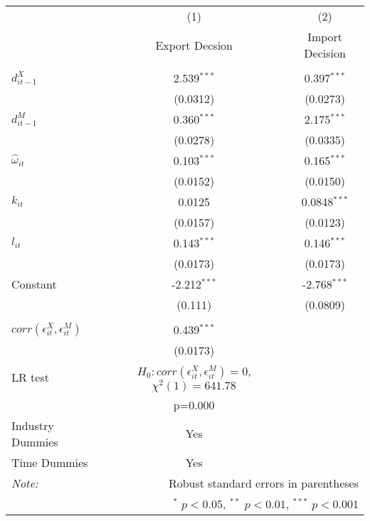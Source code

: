 \begin{center}
\begin{tabular}{l*{2}{c}}
\hline\hline
            &\multicolumn{1}{c}{(1)}&\multicolumn{1}{c}{(2)}\\
            &\multicolumn{1}{c}{Export
              Decsion}&\multicolumn{1}{c}{Import Decision}\\
\hline\\
$d_{it-1}^{X}$   &       2.539$^{***}$   &       0.397$^{***}$\\
            &        (0.0312)            &    (0.0273)         \\
[1em]                                                          
$d_{it-1}^{M}$   &       0.360$^{***}$   &       2.175$^{***}$\\
            &        (0.0278)            &    (0.0335)         \\
[1em]                                                          
$\hat{\omega}_{it}$&       0.103$^{***}$   &       0.165$^{***}$\\
            &        (0.0152)            &    (0.0150)         \\
[1em]                                                          
$k_{it}$       &       0.0125            &      0.0848$^{***}$\\
            &        (0.0157)            &    (0.0123)         \\
[1em]                                                          
$l_{it}$     &          0.143$^{***}$   &       0.146$^{***}$\\
            &        (0.0173)            &    (0.0173)         \\
[1em]                                                          
Constant      &        -2.212$^{***}$   &      -2.768$^{***}$\\
            &         (0.111)            &    (0.0809)         \\
\hline
\hline
      &                     \\
$corr(\epsilon_{it}^{X},\epsilon_{it}^{M}) $      &       0.439$^{***}$\\
            &    (0.0173)         \\
LR test& $H_{0}:corr(\epsilon_{it}^{X},\epsilon_{it}^{M}) =0$, $\chi^{2}(1)= 641.78$&\\
& p=0.000&\\
Industry Dummies & Yes& \\
Time Dummies& Yes& \\
\hline\hline
\textit{Note:}&\multicolumn{2}{r}{\footnotesize Robust standard errors in parentheses}\\
&\multicolumn{2}{r}{\footnotesize $^{*}$ \(p<0.05\), $^{**}$ \(p<0.01\), $^{***}$ \(p<0.001\)}\\
\end{tabular}
\end{center}
